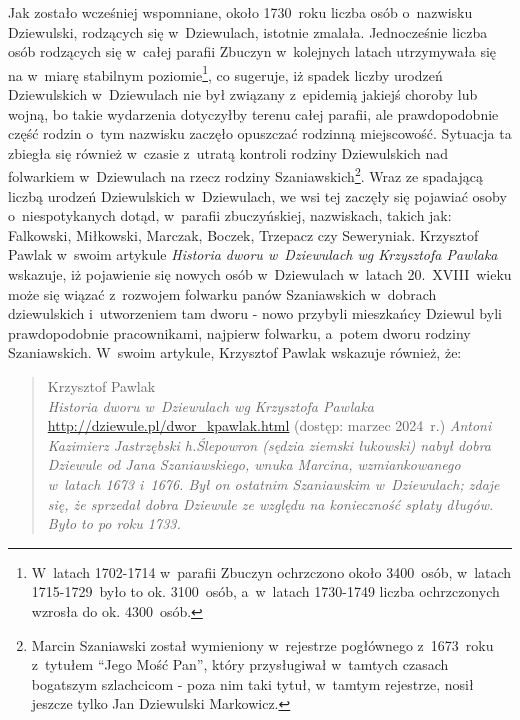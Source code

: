 Jak zostało wcześniej wspomniane, około 1730~roku liczba osób o~nazwisku 
Dziewulski, rodzących się w~Dziewulach, istotnie zmalała. Jednocześnie liczba 
osób rodzących się w~całej parafii Zbuczyn w~kolejnych latach utrzymywała się 
na w~miarę stabilnym poziomie\footnote{W~latach 1702-1714 w~parafii Zbuczyn 
ochrzczono około 3400~osób, w~latach 1715-1729~było to ok. 3100~osób, 
a~w~latach 1730-1749 liczba ochrzczonych wzrosła do ok. 4300~osób.}, co 
sugeruje, iż spadek liczby urodzeń Dziewulskich w~Dziewulach nie był związany 
z~epidemią jakiejś choroby lub wojną, bo takie wydarzenia dotyczyłby terenu 
całej parafii, ale prawdopodobnie część rodzin o~tym nazwisku zaczęło 
opuszczać rodzinną miejscowość. Sytuacja ta zbiegła się również w~czasie 
z~utratą kontroli rodziny Dziewulskich nad folwarkiem w~Dziewulach na rzecz 
rodziny Szaniawskich\footnote{Marcin Szaniawski został wymieniony w~rejestrze 
pogłównego z~1673~roku z~tytułem \enquote{Jego Mość Pan}, który przysługiwał 
w~tamtych czasach bogatszym szlachcicom - poza nim taki tytuł, w~tamtym 
rejestrze, nosił jeszcze tylko Jan Dziewulski Markowicz.}. Wraz ze spadającą 
liczbą urodzeń Dziewulskich w~Dziewulach, we wsi tej zaczęły się pojawiać 
osoby o~niespotykanych dotąd, w~parafii zbuczyńskiej, nazwiskach, takich jak: 
Falkowski, Miłkowski, Marczak, Boczek, Trzepacz czy Seweryniak. Krzysztof 
Pawlak w~swoim artykule \emph{Historia dworu w~Dziewulach wg Krzysztofa 
Pawlaka} \cite{kpawlak} wskazuje, iż pojawienie się nowych osób w~Dziewulach 
w~latach 20.~XVIII~wieku może się wiązać z~rozwojem folwarku panów 
Szaniawskich w~dobrach dziewulskich i~utworzeniem tam dworu - nowo przybyli 
mieszkańcy Dziewul byli prawdopodobnie pracownikami, najpierw folwarku, 
a~potem dworu rodziny Szaniawskich. W~swoim artykule, Krzysztof Pawlak 
wskazuje również, że:

\begin{quote}{Krzysztof Pawlak \\ \null\hfill \emph{Historia dworu 
    w~Dziewulach wg Krzysztofa Pawlaka} \\ \null\hfill 
    \url{http://dziewule.pl/dwor_kpawlak.html} (dostęp: marzec 2024~r.)}
\textit{Antoni Kazimierz Jastrzębski h.Ślepowron (sędzia ziemski łukowski) 
nabył dobra Dziewule od Jana Szaniawskiego, wnuka Marcina, wzmiankowanego 
w~latach 1673 i~1676. Był on ostatnim Szaniawskim w~Dziewulach; zdaje się, 
że sprzedał dobra Dziewule ze względu na konieczność spłaty długów. Było to 
po roku 1733.}
\end{quote}


